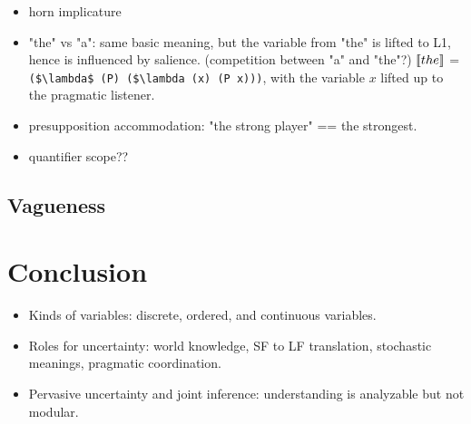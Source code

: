 \documentclass[12pt]{article}
\newcommand{\llbracket}{\ensuremath{\left [\!\left [}}%
\newcommand{\rrbracket}{\ensuremath{\right ]\!\right ]}}
\providecommand{\sv}[1]{\ensuremath{\llbracket #1 \rrbracket}}
\begin{document}


\begin{itemize}
\item horn implicature
\item  "the" vs "a": same basic meaning, but the variable from "the" is lifted to L1, hence is influenced by salience. (competition between "a" and "the"?)
\subitem \sv{the} = \lstinline{($\lambda$ (P) ($\lambda (x) (P x)))}, with the variable $x$ lifted up to the pragmatic listener. 
\item  presupposition accommodation: "the strong player" == the strongest.
\item quantifier scope??
\end{itemize}

\subsection{Vagueness}









\section{Conclusion}
\begin{itemize}
\item  Kinds of variables: discrete, ordered, and continuous variables.
\item  Roles for uncertainty: world knowledge, SF to LF translation, stochastic meanings, pragmatic coordination.
\item  Pervasive uncertainty and joint inference: understanding is analyzable but not modular.
\end{itemize}






\appendix
\end{document}
